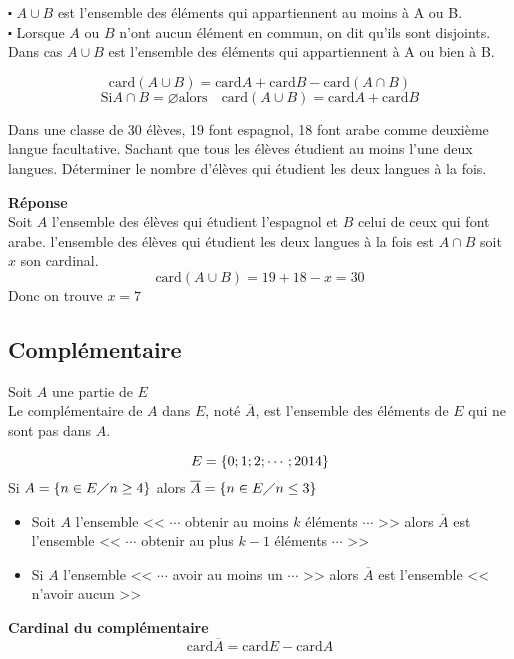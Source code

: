 \begin{remark}
$ \centerdot $ $A\cup B$ est l'ensemble des éléments qui appartiennent  au moins à A ou B.\\
$ \centerdot $ Lorsque $ A$ ou  $ B$ n'ont aucun élément en commun, on dit qu'ils sont disjoints. Dans cas  $A\cup B$  est l'ensemble des éléments qui appartiennent à A ou bien à B.
\end{remark}
\begin{theorem}
                 \[\textrm{card}(A\cup B)= \textrm{card}A  + \textrm{card}B- \textrm{card}(A\cap B) \]
                  \[ \textrm{Si}  A\cap B=\varnothing  \textrm{alors}\quad \textrm{card}(A\cup B)= \textrm{card}A  + \textrm{card}B   \]
\end{theorem}
\begin{exercice}
Dans une classe de 30 élèves, 19 font espagnol, 18 font arabe comme deuxième langue facultative. Sachant que tous les élèves étudient au moins l'une  deux  langues. Déterminer le nombre d'élèves qui étudient les deux langues à la fois.
\end{exercice}
\textbf{Réponse}\\
Soit $ A $ l'ensemble des élèves qui étudient l'espagnol et $ B $ celui de ceux qui font arabe. l'ensemble des élèves qui étudient les deux langues à la fois est $A\cap B  $ soit $ x $ son cardinal. 
\[\textrm{card}(A\cup B)= 19+18-x=30  \]Donc on trouve $ x=7 $
\subsection*{Complémentaire}
Soit  $ A $ une partie de $ E $\\
 Le  complémentaire de $ A $ dans $ E $,  noté  $ \overline{A} $, est l'ensemble des éléments  de $ E $ qui ne sont pas dans $ A. $
\begin{example}
$$ E=\left\{0;1;2; \cdots ; 2014\right\} $$
Si $ A=\left\{n\in E \diagup n\geq 4\right\} $ alors  $ \overline{A}=\left\{n\in E \diagup n \leq 3\right\} $ 
\end{example}
\begin{remark}
\begin{itemize}
\item  Soit $ A $ l'ensemble << $\cdots$ obtenir au moins $k$ éléments $ \cdots $ >>  alors  $ \overline{A} $ est l'ensemble << $\cdots$ obtenir au plus $k-1$ éléments $ \cdots $ >>
\item  Si $ A $ l'ensemble << $\cdots$ avoir au moins un  $ \cdots $ >>  alors   $ \overline{A} $ est l'ensemble << n'avoir aucun >>
\end{itemize}
\end{remark}
\textbf{Cardinal du complémentaire}
\[ \textrm{card} \overline{A} = \textrm{card}E - \textrm{card}A \]


